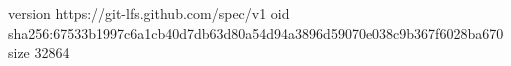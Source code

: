 version https://git-lfs.github.com/spec/v1
oid sha256:67533b1997c6a1cb40d7db63d80a54d94a3896d59070e038c9b367f6028ba670
size 32864
